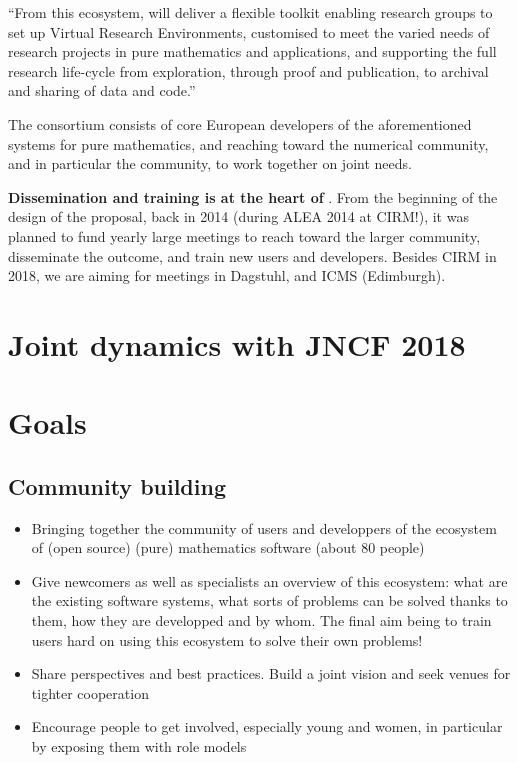 \documentclass[12pt]{amsbook}
\begin{document}
``From this ecosystem, \ODK will deliver a flexible toolkit enabling
research groups to set up Virtual Research Environments, customised to
meet the varied needs of research projects in pure mathematics and
applications, and supporting the full research life-cycle from
exploration, through proof and publication, to archival and sharing of
data and code.''

The \ODK  consortium consists of core European developers of the
aforementioned systems for pure mathematics, and reaching toward the
numerical community, and in particular the \Jupyter  community, to work
together on joint needs.

\textbf{Dissemination and training is at the heart of \ODK}. From the
beginning of the design of the proposal, back in 2014 (during ALEA
2014 at CIRM!), it was planned to fund yearly large meetings to reach
toward the larger community, disseminate the outcome, and train new
users and developers. Besides CIRM in 2018, we are aiming for meetings
in Dagstuhl, and ICMS (Edimburgh).


\section{Joint dynamics with JNCF 2018}

\section{Goals}

\subsection{Community building}
\begin{itemize}
\item{Bringing together the community of users and developpers of the
ecosystem of (open source) (pure) mathematics software (about 80 people)}

\item{Give newcomers as well as specialists an overview of this ecosystem:
what are the existing software systems, what sorts of problems can be solved thanks to them, how they are developped and by whom. The final aim being to train users hard
on using this ecosystem to solve their own problems!}

\item{Share perspectives and best practices. Build a joint vision and seek
venues for tighter cooperation}

\item{Encourage people to get involved, especially young and women, in
particular by exposing them with role models}
\end{itemize}
\end{document}
